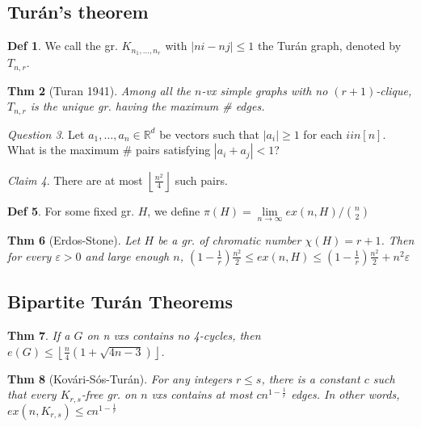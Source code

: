 \documentclass[11pt, fleqn, a4paper, landscape]{article}
\theoremstyle{plain} %
\newtheorem{thm}{Thm}
\theoremstyle{remark} %
\newtheorem{claim}[thm]{Claim}
\newtheorem{que}[thm]{Question}
\theoremstyle{definition} %
\newtheorem{defi}[thm]{Def}
\begin{document}
\begin{multicols}{5}
\subsection{Turán’s theorem}
\begin{defi}
We call the gr. $K_{n_1,\dots,n_r}$ with $|ni - nj|\le 1$ the Turán graph, denoted by $T_{n,r}$.
\end{defi}

\begin{thm}[Turan 1941]
Among all the $n$-vx simple graphs with no $(r + 1)$-clique, $T_{n,r}$ is
the unique gr. having the maximum \# edges.
\end{thm} 

\begin{que}
Let $a_1, \dots , a_n \in \mathbb{R}^d$ be vectors such that $|a_i|\ge 1$ for each $i in [n]$. What is the maximum \# pairs satisfying $|a_i + a_j| < 1$?
\end{que}

\begin{claim}
There are at most $\left\lfloor \frac{n^2}{4}\right\rfloor$ such pairs.
\end{claim}

\begin{defi}
For some fixed gr. $H$, we define $\pi(H) = \lim\limits_{n\to\infty} ex(n,H)/\binom{n}{2}$
\end{defi}

\begin{thm}[Erdos-Stone]
Let $H$ be a gr. of chromatic number $\chi(H) = r + 1$. Then for
every $\varepsilon > 0$ and large enough $n$, $\left(1-\frac{1}{r}\right)\frac{n^2}{2}\le ex(n,H)\le\left(1-\frac{1}{r}\right)\frac{n^2}{2}+n^2\varepsilon$
\end{thm}
 \addtocounter{thm}{1}
\subsection{Bipartite Turán Theorems}

\begin{thm}
If a $G$ on n vxs contains no 4-cycles, then $e(G)\le\left\lfloor\frac{n}{4}(1+\sqrt{4n-3})\right\rfloor$.
\end{thm}
\addtocounter{thm}{1}
\begin{thm}[Kovári-Sós-Turán]
For any integers $r \le s$, there is a constant $c$ such that every
$K_{r,s}$-free gr. on $n$ vxs contains at most $cn^{1-\frac{1}{r}}$ edges. In other words, $ex(n,K_{r,s}) \le cn^{1-\frac{1}{r}}$ 
\end{thm}


\end{multicols}
\end{document}

